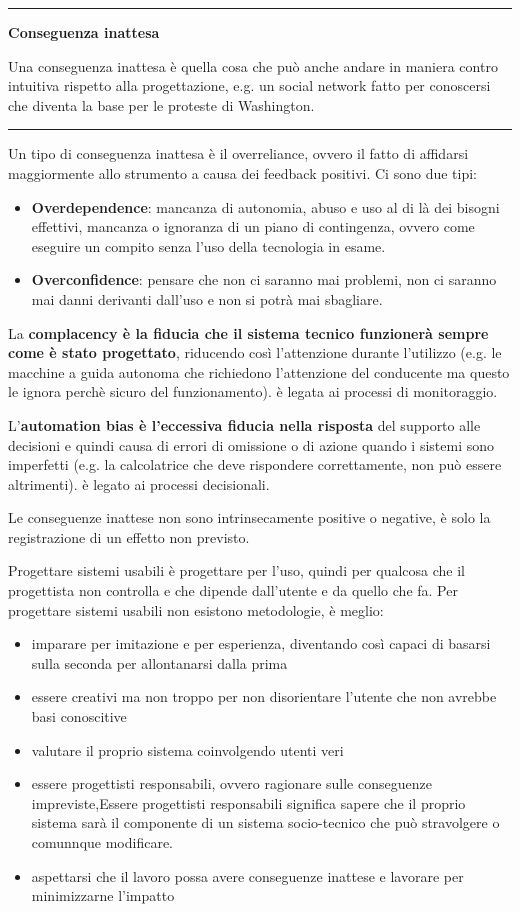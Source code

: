 \documentclass[11pt,a4paper]{book}
\begin{document}
\noindent\rule{\textwidth}{1pt}
\begin{center}
	\textbf{Conseguenza inattesa}
\end{center}

Una conseguenza inattesa è quella cosa che può anche andare in maniera contro intuitiva rispetto alla progettazione, e.g. un social network fatto per conoscersi che diventa la base per le proteste di Washington.

\noindent\rule{\textwidth}{1pt}

Un tipo di conseguenza inattesa è il overreliance, ovvero il fatto di affidarsi maggiormente allo strumento a causa dei feedback positivi. Ci sono due tipi:
\begin{itemize}
	\item \textbf{Overdependence}: mancanza di autonomia, abuso e uso al di là dei bisogni effettivi, mancanza o ignoranza di un piano di contingenza, ovvero come eseguire un compito senza l'uso della tecnologia in esame.
	\item \textbf{Overconfidence}: pensare che non ci saranno mai problemi, non ci saranno mai danni derivanti dall'uso e non si potrà mai sbagliare.
\end{itemize}

La \textbf{complacency è la fiducia che il sistema tecnico funzionerà sempre come è stato progettato}, riducendo così l'attenzione durante l'utilizzo (e.g. le macchine a guida autonoma che richiedono l'attenzione del conducente ma questo le ignora perchè sicuro del funzionamento). è legata ai processi di monitoraggio.

L'\textbf{automation bias è l'eccessiva fiducia nella risposta} del supporto alle decisioni e quindi causa di errori di omissione o di azione quando i sistemi sono imperfetti (e.g. la calcolatrice che deve rispondere correttamente, non può essere altrimenti). è legato ai processi decisionali. \label{par: automation bias}

Le conseguenze inattese non sono intrinsecamente positive o negative, è solo la registrazione di un effetto non previsto.


Progettare sistemi usabili è progettare per l'uso, quindi per qualcosa che il progettista non controlla e che dipende dall'utente e da quello che fa. Per progettare sistemi usabili non esistono metodologie, è meglio:
\begin{itemize}
	\item imparare per imitazione e per esperienza, diventando così capaci di basarsi sulla seconda per allontanarsi dalla prima
	\item essere creativi ma non troppo per non disorientare l'utente che non avrebbe basi conoscitive
	\item valutare il proprio sistema coinvolgendo utenti veri
	\item essere progettisti responsabili, ovvero ragionare sulle conseguenze impreviste,Essere progettisti responsabili significa sapere che il proprio sistema sarà il componente di un sistema socio-tecnico che può stravolgere o comunnque modificare.
	\item aspettarsi che il lavoro possa avere conseguenze inattese e lavorare per minimizzarne l'impatto
\end{itemize}
\end{document}
